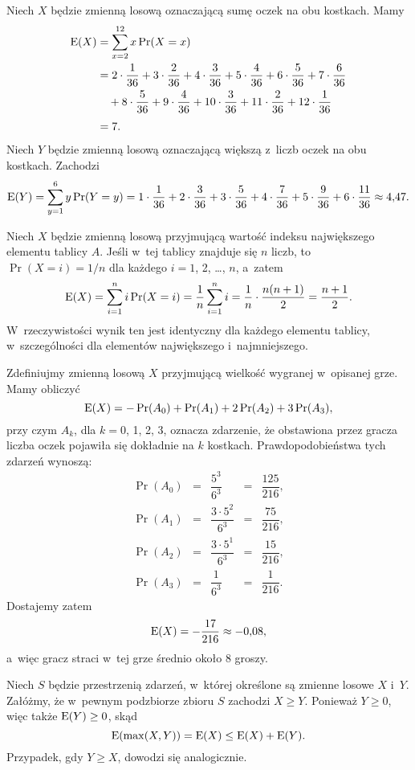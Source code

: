 
\exercise %
Niech $X$ będzie zmienną losową oznaczającą sumę oczek na obu kostkach.
Mamy
\begin{align*}
	\operatorname{E}(X) &= \sum_{x=2}^{12}x\Pr(X=x) \\
	&= 2\cdot\frac{1}{36}+3\cdot\frac{2}{36}+4\cdot\frac{3}{36}+5\cdot\frac{4}{36}+6\cdot\frac{5}{36}+7\cdot\frac{6}{36} \\
	&\quad {}+8\cdot\frac{5}{36}+9\cdot\frac{4}{36}+10\cdot\frac{3}{36}+11\cdot\frac{2}{36}+12\cdot\frac{1}{36} \\[1mm]
	&= 7.
\end{align*}
Niech $Y$ będzie zmienną losową oznaczającą większą z~liczb oczek na obu kostkach.
Zachodzi
\[
	\operatorname{E}(Y) = \sum_{y=1}^{6}y\Pr(Y=y) = 1\cdot\frac{1}{36}+2\cdot\frac{3}{36}+3\cdot\frac{5}{36}+4\cdot\frac{7}{36}+5\cdot\frac{9}{36}+6\cdot\frac{11}{36} \approx 4{,}47.
\]

\exercise %
Niech $X$ będzie zmienną losową przyjmującą wartość indeksu największego elementu tablicy $A$.
Jeśli w~tej tablicy znajduje się $n$ liczb, to $\Pr(X=i)=1/n$ dla każdego $i=1$, 2, \dots, $n$, a~zatem
\[
	\operatorname{E}(X) = \sum_{i=1}^ni\Pr(X=i) = \frac{1}{n}\sum_{i=1}^ni = \frac{1}{n}\cdot\frac{n(n+1)}{2} = \frac{n+1}{2}.
\]
W~rzeczywistości wynik ten jest identyczny dla każdego elementu tablicy, w~szczególności dla elementów największego i~najmniejszego.

\exercise %
Zdefiniujmy zmienną losową $X$ przyjmującą wielkość wygranej w~opisanej grze.
Mamy obliczyć
\[
	\operatorname{E}(X) = -\Pr(A_0)+\Pr(A_1)+2\Pr(A_2)+3\Pr(A_3),
\]
przy czym $A_k$, dla $k=0$, 1, 2, 3, oznacza zdarzenie, że obstawiona przez gracza liczba oczek pojawiła się dokładnie na $k$ kostkach.
Prawdopodobieństwa tych zdarzeń wynoszą:
\[
	\begin{array}{ccccc}
	\Pr(A_0) &=& \dfrac{5^3}{6^3} &=& \dfrac{125}{216}, \\[3mm]
	\Pr(A_1) &=& \dfrac{3\cdot 5^2}{6^3} &=& \dfrac{75}{216}, \\[3mm]
	\Pr(A_2) &=& \dfrac{3\cdot 5^1}{6^3} &=& \dfrac{15}{216}, \\[3mm]
	\Pr(A_3) &=& \dfrac{1}{6^3} &=& \dfrac{1}{216}.
	\end{array}
\]
Dostajemy zatem
\[
	\operatorname{E}(X) = -\dfrac{17}{216} \approx -0{,}08,
\]
a~więc gracz straci w~tej grze średnio około 8 groszy.

\exercise %
Niech $S$ będzie przestrzenią zdarzeń, w~której określone są zmienne losowe $X$ i~$Y$.
Załóżmy, że w~pewnym podzbiorze zbioru $S$ zachodzi $X\ge Y$.
Ponieważ $Y\ge0$, więc także $\operatorname{E}(Y)\ge0$, skąd
\[
    \operatorname{E}(\max(X,Y)) = \operatorname{E}(X) \le \operatorname{E}(X)+\operatorname{E}(Y).
\]
Przypadek, gdy $Y\ge X$, dowodzi się analogicznie.

